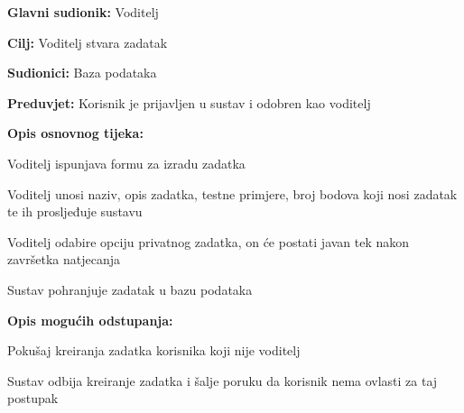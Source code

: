 					\noindent {}
					\begin{packed_item}
						
						\item \textbf{Glavni sudionik: }Voditelj
						\item  \textbf{Cilj:} Voditelj stvara zadatak 
						\item  \textbf{Sudionici:} Baza podataka
						\item  \textbf{Preduvjet:} Korisnik je prijavljen u sustav i odobren kao voditelj
						\item  \textbf{Opis osnovnog tijeka:}
						
						\item[] \begin{packed_enum}
							
							\item Voditelj ispunjava formu za izradu zadatka
							\item Voditelj unosi naziv, opis zadatka, testne primjere, broj bodova koji nosi zadatak te ih prosljeđuje sustavu
							\item Voditelj odabire opciju privatnog zadatka, on će postati javan tek nakon završetka natjecanja
							\item Sustav pohranjuje zadatak u bazu podataka
							
						\end{packed_enum}
						
						\item  \textbf{Opis mogućih odstupanja:}
						
						\item[] \begin{packed_item}
							
							\item[2.a] Pokušaj kreiranja zadatka korisnika koji nije voditelj
							\item[] \begin{packed_enum}
								
								\item Sustav odbija kreiranje zadatka i šalje poruku da korisnik nema ovlasti za taj postupak 
								
							\end{packed_enum}
						\end{packed_item}
					\end{packed_item}
					
					\eject
					
